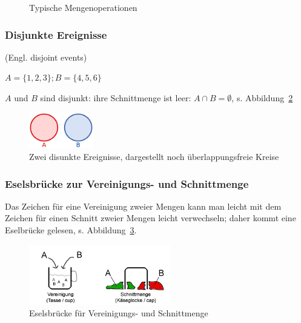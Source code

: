 \documentclass[
  a4paper,
  DIV=11]{scrreprt}
\theoremstyle{definition}
\theoremstyle{remark}
\begin{document}
\begin{figure}
\begin{minipage}[t]{0.50\linewidth}
{{}

\caption{\(A \setminus B\)}

}

\end{minipage}%

\caption{\label{fig-sets}Typische Mengenoperationen}

\end{figure}

\hypertarget{disjunkte-ereignisse}{%
\subsubsection{Disjunkte Ereignisse}\label{disjunkte-ereignisse}}

(Engl. disjoint events)

\(A= \{1,2,3\}; B= \{4,5,6\}\)

\(A\) und \(B\) sind disjunkt: ihre Schnittmenge ist leer:
\(A \cap B = \emptyset\), s. Abbildung~\ref{fig-disjunkt}

\begin{figure}

{\centering \includegraphics[width=0.25\textwidth,height=\textheight]{./img/2880px-Disjunkte_Mengen.svg.png}

}

\caption{\label{fig-disjunkt}Zwei disunkte Ereignisse, dargestellt noch
überlappungsfreie Kreise}

\end{figure}

\hypertarget{eselsbruxfccke-zur-vereinigungs--und-schnittmenge}{%
\subsubsection{Eselsbrücke zur Vereinigungs- und
Schnittmenge}\label{eselsbruxfccke-zur-vereinigungs--und-schnittmenge}}

Das Zeichen für eine Vereinigung zweier Mengen kann man leicht mit dem
Zeichen für einen Schnitt zweier Mengen leicht verwechseln; daher kommt
eine Eselbrücke gelesen, s. Abbildung~\ref{fig-esel}.

\begin{figure}

{\centering \includegraphics[width=0.55\textwidth,height=\textheight]{./img/ven_cup_cap.jpeg}

}

\caption{\label{fig-esel}Eselsbrücke für Vereinigungs- und Schnittmenge}

\end{figure}
\end{document}

